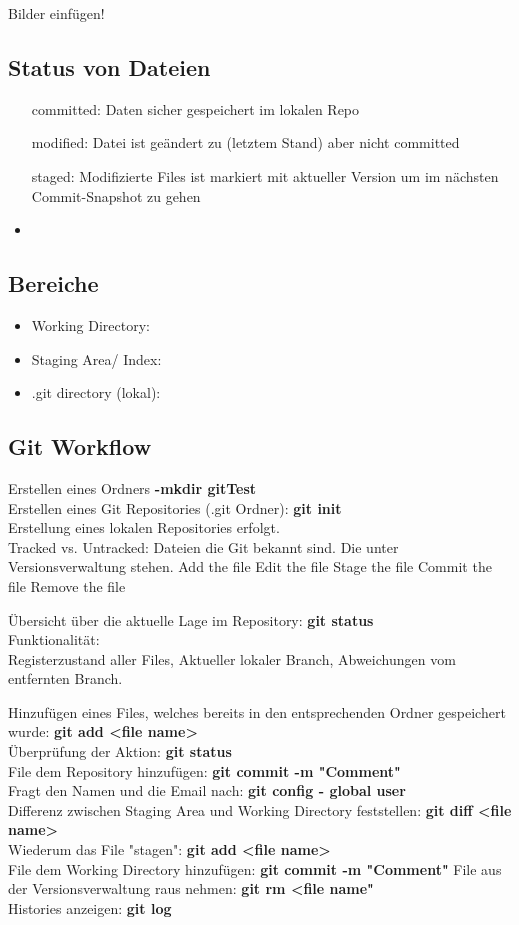 Bilder einfügen!

\subsection{Status von Dateien}
\begin{itemize}
	\item [committed:] Daten sicher gespeichert im lokalen Repo
	\item [modified:] Datei ist geändert zu (letztem Stand) aber nicht committed
	\item [staged:] Modifizierte Files ist markiert mit aktueller Version um im nächsten Commit-Snapshot zu gehen
	\item
\end{itemize}

\subsection{Bereiche}
\begin{itemize}
	\item Working Directory:
	\item Staging Area/ Index: 
	\item .git directory (lokal):
\end{itemize}

\subsection{Git Workflow}
Erstellen eines Ordners
\textbf{-mkdir gitTest} \\
Erstellen eines Git Repositories (.git Ordner):
\textbf{git init} \\
Erstellung eines lokalen Repositories erfolgt. \\

Tracked vs. Untracked: Dateien die Git bekannt sind. Die unter Versionsverwaltung stehen. 
Add the file
Edit the file
Stage the file
Commit the file
Remove the file

Übersicht über die aktuelle Lage im Repository: \textbf{git status} \\
Funktionalität: \\
Registerzustand aller Files, Aktueller lokaler Branch, Abweichungen vom entfernten Branch.

Hinzufügen eines Files, welches bereits in den entsprechenden Ordner gespeichert wurde: \textbf{git add <file name>} \\
Überprüfung der Aktion: \textbf{git status} \\
File dem Repository hinzufügen: \textbf{git commit -m "Comment"} \\
Fragt den Namen und die Email nach: \textbf{git config - global user} \\
Differenz zwischen Staging Area und Working Directory feststellen: \textbf{git diff <file name>} \\
Wiederum das File "stagen": \textbf{git add <file name>} \\
File dem Working Directory hinzufügen: \textbf{git commit -m "Comment"}
File aus der Versionsverwaltung raus nehmen: \textbf{git rm <file name"} \\
Histories anzeigen: \textbf{git log}

